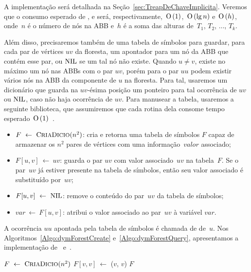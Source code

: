 A implementação será detalhada na Seção~\ref{sec:TreapDeChaveImplicita}. Veremos que o consumo esperado de \treapCreate, \treapGetRoot{} e \treapJoin{} será, respectivamente,~$\text{O}\left(1\right)$,~$\text{O}\left(\lg n\right)$ e~$\text{O}\left(h\right)$, onde~$n$ é o número de nós na ABB e~$h$ é a soma das alturas de~$T_1$, $T_2$, $\ldots$, $T_k$. 

Além disso, precisaremos também de uma tabela de símbolos para guardar, para cada par de vértices $uv$ da floresta, um apontador para um nó da ABB que contém esse par, ou $\text{NIL}$ se um tal nó não existe. Quando $ u\neq v$, existe no máximo um nó nas ABBs com o par $uv$, porém para o par $uu$ podem existir vários nós na ABB da componente de $u$ na floresta. Para tal, usaremos um dicionário que guarda na $uv$-ésima posição um ponteiro para tal ocorrência de $uv$ ou $\text{NIL}$, caso não haja ocorrência de $uv$. Para manusear a tabela, usaremos a seguinte biblioteca, que assumiremos que cada rotina dela consome tempo esperado~$\text{O}\left(1\right)$~\cite{CLRS}.
\begin{itemize}
    \item $F~\gets~\text{{\text{C{\footnotesize RIA}}\text{D{\footnotesize ICIO}}}}(n^2)$: cria e retorna uma tabela de símbolos $F$ capaz de armazenar os $n^2$ pares de vértices com uma informação~$valor$ associado;
    \item $F[u,v]~\gets~uv$: guarda o par $uv$ com valor associado~$uv$ na tabela~$F$. Se o par~$uv$ já estiver presente na tabela de símbolos, então seu valor associado é substituído por~$uv$;
    \item $F[u,v]~\gets~\text{NIL}{}$: remove o conteúdo do par~$uv$ da tabela de símbolos;
    \item $var~\gets~F[u,v]$: atribui o valor associado ao par~$uv$ à variável $var$.
\end{itemize}

A ocorrência $uu$ apontada pela tabela de símbolos é chamada de  de~$u$. Nos Algoritmos~\ref{Algo:dymForestCreate} e~\ref{Algo:dymForestQuery}, apresentamos a implementação de~\dymForestCreate{} e~\dymForestQuery. 

\begin{algorithm}[htb]
\caption{\dymForestCreate($n$)}
\label{Algo:dymForestCreate}
\begin{algorithmic}[1]
\State $F~\gets~\text{{\text{C{\footnotesize RIA}}\text{D{\footnotesize ICIO}}}}(n^2)$
\label{Algo:dymForestCreate:for}
\State $F[v,v]~\gets$ \treapCreate($v$, $v$)
\EndFor
\State \Return $F$
\end{algorithmic}
\end{algorithm}

